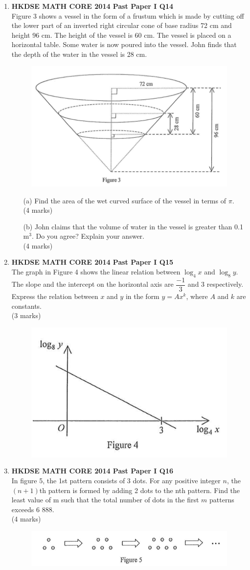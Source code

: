 \documentclass[12pt]{article}
\begin{document}
\begin{enumerate}
	\item \textbf{HKDSE MATH CORE 2014 Past Paper I Q14}\\
	Figure 3 shows a vessel in the form of a frustum which is made by cutting off the lower part of an inverted right circular cone of base radius 72 cm and height 96 cm. The height of the vessel is 60 cm. The vessel is placed on a horizontal table. Some water is now poured into the vessel. John finds that the depth of the water in the vessel is 28 cm.
	\begin{figure}[H]
		\centering
		\includegraphics[width = .3\linewidth]{2014Figure1.3}
	\end{figure}
	\begin{enumerate}
		\item[(a)] Find the area of the wet curved surface of the vessel in terms of $\pi$. \\(4 marks)
		\item[(b)] John claims that the volume of water in the vessel is greater than 0.1 m$^3$. Do you agree? Explain your answer. \\(4 marks)
	\end{enumerate}

	\item \textbf{HKDSE MATH CORE 2014 Past Paper I Q15}\\
	The graph in Figure 4 shows the linear relation between $\log_4x$ and $\log_8y$. The slope and the intercept on the horizontal axis are $\dfrac{-1}{3}$ and 3 respectively. Express the relation between $x$ and $y$ in the form $y = Ax^k$, where $A$ and $k$ are constants. \\(3 marks)
	\begin{figure}[H]
		\centering
		\includegraphics[width = .3\linewidth]{2014Figure1.4}
	\end{figure}


	\item \textbf{HKDSE MATH CORE 2014 Past Paper I Q16}\\
	In figure 5, the 1st pattern consists of 3 dots. For any positive integer $n$, the $(n + 1)$th pattern is formed by adding 2 dots to the nth pattern. Find the least value of m such that the total number of dots in the first $m$ patterns exceeds 6 888. \\(4 marks)
	\begin{figure}[H]
		\centering
		\includegraphics[width = .3\linewidth]{2014Figure1.5}
	\end{figure}


\end{enumerate}
\end{document}
